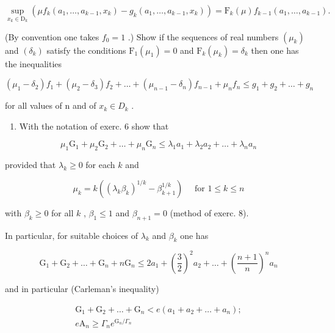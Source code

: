 \[
\sup _ {x _ {k} \in \mathrm{D} _ {k}} \left(\mu f _ {k} (a _ {1}, \dots , a _ {k - 1}, x _ {k}) - g _ {k} (a _ {1}, \dots , a _ {k - 1}, x _ {k})\right) = \mathrm{F} _ {k} (\mu) f _ {k - 1} (a _ {1}, \dots , a _ {k - 1}).
\]

(By convention one takes \(f_0 = 1\) .) Show if the sequences of real numbers \((\mu_k)\) and \((\delta_k)\) satisfy the conditions \(\mathrm{F}_1(\mu_1) = 0\) and \(\mathrm{F}_k(\mu_k) = \delta_k\) then one has the inequalities

\[
\left(\mu_ {1} - \delta_ {2}\right) f _ {1} + \left(\mu_ {2} - \delta_ {3}\right) f _ {2} + \dots + \left(\mu_ {n - 1} - \delta_ {n}\right) f _ {n - 1} + \mu_ {n} f _ {n} \leqslant g _ {1} + g _ {2} + \dots + g _ {n}
\]

for all values of n and of \(x_{k} \in D_{k}\) .

\begin{enumerate}
\def\labelenumi{\arabic{enumi})}
\setcounter{enumi}{8}
\tightlist
\item
  With the notation of exerc. 6 show that
\end{enumerate}

\[
\mu_ {1} \mathrm{G} _ {1} + \mu_ {2} \mathrm{G} _ {2} + \dots + \mu_ {n} \mathrm{G} _ {n} \leqslant \lambda_ {1} a _ {1} + \lambda_ {2} a _ {2} + \dots + \lambda_ {n} a _ {n}
\]

provided that \(\lambda_{k}\geqslant 0\) for each \(k\) and

\[
\mu_ {k} = k \left(\left(\lambda_ {k} \beta_ {k}\right) ^ {1 / k} - \beta_ {k + 1} ^ {1 / k}\right) \quad \text { for } 1 \leqslant k \leqslant n
\]

with \(\beta_{k}\geqslant 0\) for all \(k\) , \(\beta_{1}\leqslant 1\) and \(\beta_{n + 1} = 0\) (method of exerc. 8).

In particular, for suitable choices of \(\lambda_{k}\) and \(\beta_{k}\) one has

\[
\mathrm{G} _ {1} + \mathrm{G} _ {2} + \dots + \mathrm{G} _ {n} + n \mathrm{G} _ {n} \leqslant 2 a _ {1} + \left(\frac {3}{2}\right) ^ {2} a _ {2} + \dots + \left(\frac {n + 1}{n}\right) ^ {n} a _ {n}
\]

and in particular (Carleman's inequality)

\[
\begin{array}{c} \mathrm{G} _ {1} + \mathrm{G} _ {2} + \dots + \mathrm{G} _ {n} <   e (a _ {1} + a _ {2} + \dots + a _ {n}); \\ e \mathrm{A} _ {n} \geqslant \Gamma_ {n} e ^ {\mathrm{G} _ {n} / \Gamma_ {n}} \end{array}
\]

